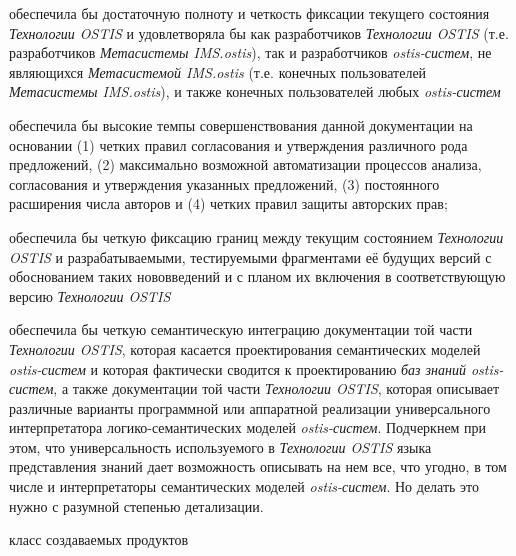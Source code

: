 \begin{scnsubstruct}
{        \begin{scnitemize}
            \item обеспечила бы достаточную полноту и четкость фиксации текущего состояния \textit{Технологии OSTIS} и удовлетворяла бы как разработчиков \textit{Технологии OSTIS} (т.е. разработчиков \textit{Метасистемы IMS.ostis}), так и разработчиков \textit{ostis-систем}, не являющихся \textit{Метасистемой IMS.ostis} (т.е. конечных пользователей \textit{Метасистемы IMS.ostis}), и также конечных пользователей любых \textit{ostis-систем}
            \item обеспечила бы высокие темпы совершенствования данной документации на основании (1) четких правил согласования и утверждения различного рода предложений, (2) максимально возможной автоматизации процессов анализа, согласования и утверждения указанных предложений, (3) постоянного расширения числа авторов и (4) четких правил защиты авторских прав;
            \item обеспечила бы четкую фиксацию границ между текущим состоянием \textit{Технологии OSTIS} и разрабатываемыми, тестируемыми фрагментами её будущих версий с обоснованием таких нововведений и с планом их включения в соответствующую версию \textit{Технологии OSTIS}
            \item обеспечила бы четкую семантическую интеграцию документации той части \textit{Технологии OSTIS}, которая касается проектирования семантических моделей \textit{ostis-систем} и которая фактически сводится к проектированию \textit{баз знаний ostis-систем}, а также документации той части \textit{Технологии OSTIS}, которая описывает различные варианты программной или аппаратной реализации универсального интерпретатора логико-семантических моделей \textit{ostis-систем}. Подчеркнем при этом, что универсальность используемого в \textit{Технологии OSTIS} языка представления знаний дает возможность описывать на нем все, что угодно, в том числе и интерпретаторы семантических моделей \textit{ostis-систем}. Но делать это нужно с разумной степенью детализации.
        \end{scnitemize}
    }
    \begin{scnrelfromlist}{класс создаваемых продуктов}
\end{scnrelfromlist}
\end{scnsubstruct}
